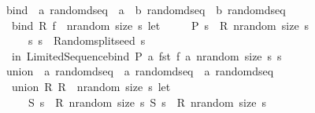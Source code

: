 \begin{isabellebody}
\isanewline
{}\isamarkupfalse%
\ bind\ {\isacharcolon}{\kern0pt}{\isacharcolon}{\kern0pt}\ {\isachardoublequoteopen}{\isacharprime}{\kern0pt}a\ random{\isacharunderscore}{\kern0pt}dseq\ {\isacharequal}{\kern0pt}{\isachargreater}{\kern0pt}\ {\isacharparenleft}{\kern0pt}{\isacharprime}{\kern0pt}a\ {\isasymRightarrow}\ {\isacharprime}{\kern0pt}b\ random{\isacharunderscore}{\kern0pt}dseq{\isacharparenright}{\kern0pt}\ {\isasymRightarrow}\ {\isacharprime}{\kern0pt}b\ random{\isacharunderscore}{\kern0pt}dseq{\isachardoublequoteclose}\isanewline
{}\isanewline
\ \ {\isachardoublequoteopen}bind\ R\ f\ {\isacharequal}{\kern0pt}\ {\isacharparenleft}{\kern0pt}{\isasymlambda}nrandom\ size\ s{\isachardot}{\kern0pt}\ let\isanewline
\ \ \ \ \ {\isacharparenleft}{\kern0pt}P{\isacharcomma}{\kern0pt}\ s{\isacharprime}{\kern0pt}{\isacharparenright}{\kern0pt}\ {\isacharequal}{\kern0pt}\ R\ nrandom\ size\ s{\isacharsemicolon}{\kern0pt}\isanewline
\ \ \ \ \ {\isacharparenleft}{\kern0pt}s{}{\isacharcomma}{\kern0pt}\ s{}{\isacharparenright}{\kern0pt}\ {\isacharequal}{\kern0pt}\ Random{\isachardot}{\kern0pt}split{\isacharunderscore}{\kern0pt}seed\ s{\isacharprime}{\kern0pt}\isanewline
\ \ in\ {\isacharparenleft}{\kern0pt}Limited{\isacharunderscore}{\kern0pt}Sequence{\isachardot}{\kern0pt}bind\ P\ {\isacharparenleft}{\kern0pt}{\isacharpercent}{\kern0pt}a{\isachardot}{\kern0pt}\ fst\ {\isacharparenleft}{\kern0pt}f\ a\ nrandom\ size\ s{}{\isacharparenright}{\kern0pt}{\isacharparenright}{\kern0pt}{\isacharcomma}{\kern0pt}\ s{}{\isacharparenright}{\kern0pt}{\isacharparenright}{\kern0pt}{\isachardoublequoteclose}\isanewline
\isanewline
{}\isamarkupfalse%
\ union\ {\isacharcolon}{\kern0pt}{\isacharcolon}{\kern0pt}\ {\isachardoublequoteopen}{\isacharprime}{\kern0pt}a\ random{\isacharunderscore}{\kern0pt}dseq\ {\isacharequal}{\kern0pt}{\isachargreater}{\kern0pt}\ {\isacharprime}{\kern0pt}a\ random{\isacharunderscore}{\kern0pt}dseq\ {\isacharequal}{\kern0pt}{\isachargreater}{\kern0pt}\ {\isacharprime}{\kern0pt}a\ random{\isacharunderscore}{\kern0pt}dseq{\isachardoublequoteclose}\isanewline
{}\isanewline
\ \ {\isachardoublequoteopen}union\ R{}\ R{}\ {\isacharequal}{\kern0pt}\ {\isacharparenleft}{\kern0pt}{\isasymlambda}nrandom\ size\ s{\isachardot}{\kern0pt}\ let\isanewline
\ \ \ \ \ {\isacharparenleft}{\kern0pt}S{}{\isacharcomma}{\kern0pt}\ s{\isacharprime}{\kern0pt}{\isacharparenright}{\kern0pt}\ {\isacharequal}{\kern0pt}\ R{}\ nrandom\ size\ s{\isacharsemicolon}{\kern0pt}\ {\isacharparenleft}{\kern0pt}S{}{\isacharcomma}{\kern0pt}\ s{\isacharprime}{\kern0pt}{\isacharprime}{\kern0pt}{\isacharparenright}{\kern0pt}\ {\isacharequal}{\kern0pt}\ R{}\ nrandom\ size\ s{\isacharprime}{\kern0pt}\isanewline

\end{isabellebody}

